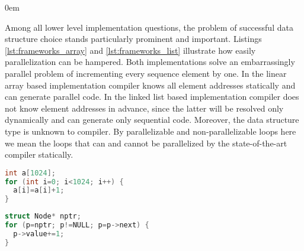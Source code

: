 \begin{description}[style=unboxed,leftmargin=0cm]
\itemsep0em
\item[\textit{The grand problem of Data-Centric Parallelization (DCP)}] Among all lower level implementation questions, the problem of successful data structure choice stands particularly prominent and important. Listings \ref{lst:frameworks_array} and \ref{lst:frameworks_list} illustrate how easily parallelization can be hampered. Both implementations solve an embarrassingly parallel problem of incrementing every sequence element by one. In the linear array based implementation compiler knows all element addresses statically and can generate parallel code. In the linked list based implementation compiler does not know element addresses in advance, since the latter will be resolved only dynamically and can generate only sequential code. Moreover, the data structure type is unknown to compiler. By parallelizable and non-parallelizable loops here we mean the loops that can and cannot be parallelized by the state-of-the-art compiler statically.\newline\null
\begin{minipage}[t]{0.5\linewidth}
\begin{lstlisting}[caption={\raggedright Parallelizable loop operating on what is clear to compiler a \textbf{linear array}.},label={lst:frameworks_array},language=C]
int a[1024];
for (int i=0; i<1024; i++) {
  a[i]=a[i]+1;
}
\end{lstlisting}
\end{minipage}
%
\begin{minipage}[t]{0.5\linewidth}
\begin{lstlisting}[caption={\raggedright Non-parallelizable loop operating on what programmer knows is a \textbf{linked-list}.},label={lst:frameworks_list},language=C]
struct Node* nptr;
for (p=nptr; p!=NULL; p=p->next) {
  p->value+=1;
}
\end{lstlisting}
\end{minipage}


\end{description}
